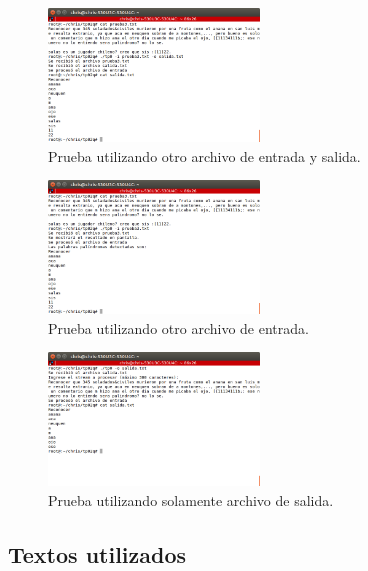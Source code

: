 \documentclass[a4paper]{article}
\begin{document}
\begin{figure}[!htp]
\begin{center}
\includegraphics[width=0.5\textwidth]{prueba3.png}
\caption{Prueba utilizando otro archivo de entrada y salida.} \label{fig001}
\end{center}
\end{figure}

\begin{figure}[!htp]
\begin{center}
\includegraphics[width=0.5\textwidth]{prueba3salidaPorPantalla.png}
\caption{Prueba utilizando otro archivo de entrada.} \label{fig001}
\end{center}
\end{figure}

\begin{figure}[!htp]
\begin{center}
\includegraphics[width=0.5\textwidth]{pruebaPorTeclado.png}
\caption{Prueba utilizando solamente archivo de salida.} \label{fig001}
\end{center}
\end{figure}

\pagebreak
\subsection{Textos utilizados}
\end{document}
